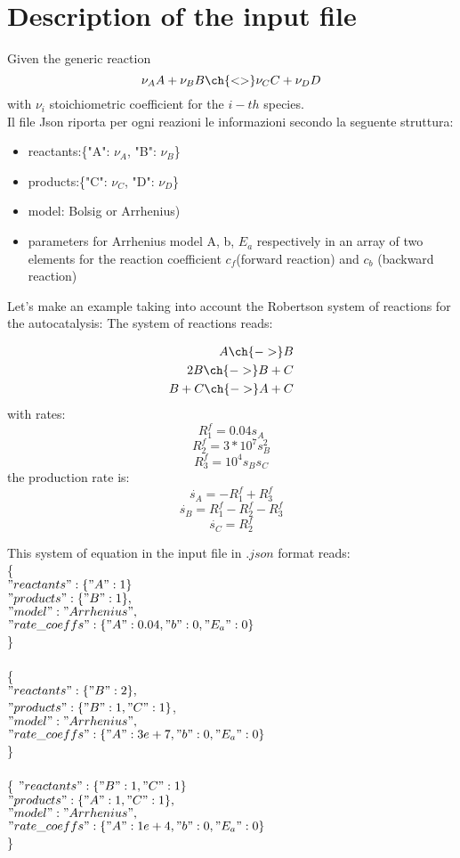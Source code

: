 \documentclass[11pt]{amsart}
\begin{document}
\section{Description of the input file}
Given the generic reaction
$$
\nu_A A + \nu_B B \ch{<>} \nu_C C + \nu_D D    
$$
with $\nu_i$ stoichiometric coefficient for the $i-th$ species.\\
Il file Json riporta per ogni reazioni le informazioni secondo la seguente struttura:
\begin{itemize}
    \item reactants:\{"A": $\nu_A$, "B": $\nu_B$\}
    \item products:\{"C": $\nu_C$, "D": $\nu_D$\}
    \item model: Bolsig or Arrhenius)
    \item parameters for Arrhenius model A, b, $E_{a}$ respectively in an array of two elements for the reaction coefficient $c_{f}$(forward reaction) and  $c_{b}$ (backward reaction)
\end{itemize}

Let's make an example taking into account the Robertson system of reactions for the autocatalysis:
The system of reactions reads:

\begin{align}
    A \ch{->} B \\
    2B\ch{->} B + C\\
    B +C \ch{->} A + C
\end{align}
with rates:
$$
R_1^f=0.04 s_A
$$
$$
R_2^f=3*10^7 s_B^2
$$
$$
R_3^f=10^4 s_Bs_C
$$
the production rate is:
$$
\dot{s_A}=-R_1^f + R_3^f
$$
$$
\dot{s_B}=R_1^f - R_2^f-R_3^f
$$
$$
\dot{s_C}=R_2^f 
$$

This system of equation in the input file in $.json$ format reads:\\
\{\\
$"reactants" : \{ "A" : 1\}$\\
$"products" : \{ "B" : 1\},$\\
$"model": "Arrhenius",$\\
$"rate\_coeffs" : \{"A":0.04, "b":0,"E_a":0\}$\\
\}\\
\\
\{\\
$"reactants" : \{ "B" : 2 \},$\\
$"products" : \{ "B" : 1, "C" : 1 \}$,\\
$"model": "Arrhenius",$\\
$"rate\_coeffs" : \{"A":3e+7, "b":0,"E_a":0\}$\\
\}\\
\\
\{
$"reactants":\{ "B" : 1, "C" : 1 \}$\\
$"products" : \{ "A" : 1, "C" : 1 \},$\\
$"model": "Arrhenius",$\\
$"rate\_coeffs" : \{"A":1e+4, "b":0,"E_a":0\}$\\
\}\\
\end{document}
